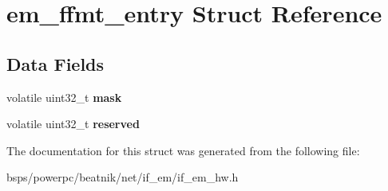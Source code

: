 \hypertarget{structem__ffmt__entry}{}\section{em\+\_\+ffmt\+\_\+entry Struct Reference}
\label{structem__ffmt__entry}
\subsection*{Data Fields}
\begin{DoxyCompactItemize}
\item 
\mbox{\label{structem__ffmt__entry_acfbf0c80d71c9549e3f4d958cce672c3}} 
volatile uint32\+\_\+t {\bfseries mask}
\item 
\mbox{\label{structem__ffmt__entry_ac3559e4c65743edf1410c287074a7239}} 
volatile uint32\+\_\+t {\bfseries reserved}
\end{DoxyCompactItemize}


The documentation for this struct was generated from the following file\+:\begin{DoxyCompactItemize}
\item 
bsps/powerpc/beatnik/net/if\+\_\+em/if\+\_\+em\+\_\+hw.\+h\end{DoxyCompactItemize}
